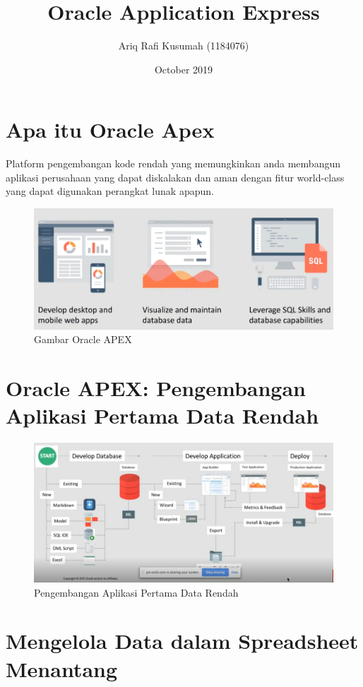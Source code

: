 \documentclass[12pt, times new roman, a4paper]{article}
\title{Oracle Application Express}
\author{Ariq Rafi Kusumah (1184076)}
\date{October 2019}
\begin{document}
\maketitle
\section{Apa itu Oracle Apex}

Platform pengembangan kode rendah yang memungkinkan anda membangun
aplikasi perusahaan yang dapat diskalakan dan aman dengan ﬁtur world-class yang dapat digunakan perangkat lunak apapun.\\

\begin{figure}[h]
	\centering
		\includegraphics[scale=0.5]{Gambar/2}
	\caption{Gambar Oracle APEX}
\end{figure}

\section{Oracle APEX: Pengembangan Aplikasi Pertama Data Rendah}

\begin{figure}[h]
	\centering
		\includegraphics[scale=0.5]{Gambar/1}
	\caption{Pengembangan Aplikasi Pertama Data Rendah}
\end{figure}

\section{Mengelola Data dalam Spreadsheet Menantang}
\end{document}
